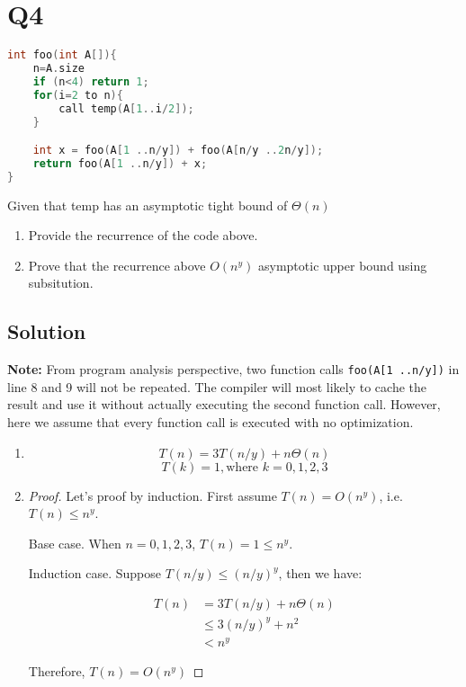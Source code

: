
\section*{Q4}

\begin{lstlisting}[language=C]
int foo(int A[]){
    n=A.size
    if (n<4) return 1;
    for(i=2 to n){
        call temp(A[1..i/2]);
    }

    int x = foo(A[1 ..n/y]) + foo(A[n/y ..2n/y]);
    return foo(A[1 ..n/y]) + x;
}
\end{lstlisting}

Given that temp has an asymptotic tight bound of $\Theta(n)$
\begin{enumerate}
    \item Provide the recurrence of the code above.
    \item Prove that the recurrence above $O(n^y)$ asymptotic upper bound using subsitution.
\end{enumerate}

\subsection*{Solution}

\textbf{Note:} From program analysis perspective, two function calls \lstinline{foo(A[1 ..n/y])} in line 8 and 9 will not be repeated.
The compiler will most likely to cache the result and use it without actually executing the second function call.
However, here we assume that every function call is executed with no optimization.


\begin{enumerate}
    \item $$T(n) = 3T(n/y) + n\Theta(n)$$ $$T(k) = 1, \text{where } k = 0, 1, 2, 3$$
    \item \begin{proof}
              Let's proof by induction.
              First assume $T(n) = O(n^y)$, i.e. $T(n) \le n^y$.

              Base case. When $n = 0, 1, 2, 3$, $T(n) = 1 \le n^y$.

              Induction case. Suppose $T(n/y) \le (n/y)^y$, then we have:

              \begin{align*}
                  T(n) & =   3T(n/y) + n\Theta(n) \\
                       & \le 3(n/y)^y + n^2       \\
                       & < n^y
              \end{align*}

              Therefore, $T(n) = O(n^y)$
          \end{proof}
\end{enumerate}